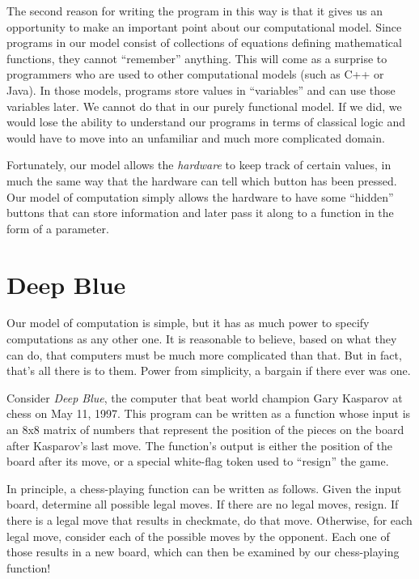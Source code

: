 The second reason for writing the program in this way is that it
gives us an opportunity to make an important point about our
computational model.  Since programs in our model consist of collections of equations defining mathematical functions, they cannot ``remember'' anything.
This will come as a surprise to programmers who are
used to other computational models (such as C++ or Java).
In those models, programs store
values in ``variables'' and can use those variables later.
We cannot do that in our purely functional model.  If we did, we
would lose the ability to understand our programs in terms of classical
logic and would have to move into an unfamiliar and
much more complicated domain.

Fortunately, our
model allows the \emph{hardware} to keep track of certain values, in much the
same way that the hardware can tell which button has been pressed.
Our model of computation simply allows the hardware to have some
``hidden'' buttons that can store information and later pass it along to
a function in the form of a parameter.

\section{Deep Blue}

Our model of computation is simple, but it has as much power to specify computations
as any other one. It is reasonable to believe, based on what they
can do, that computers must be much more complicated than that.
But in fact, that's all there is to them.
Power from simplicity, a bargain if there ever was one.

Consider \textit{Deep Blue}, the
computer that beat world champion Gary Kasparov at chess on May 11,
1997.  This program can be written as a function whose input is
an 8x8 matrix of numbers that represent the position of the pieces
on the board after Kasparov's last move.  The function's output is
either the position of the board after its move, or a special
white-flag token used to ``resign'' the game.

In principle, a chess-playing function can be written as follows.
Given the input board, determine all possible legal moves.  If there
are no legal moves, resign.  If there is a legal move that results
in checkmate, do that move.  Otherwise, for each legal move, consider
each of the possible moves by the opponent.  Each one of those results
in a new board, which can then be examined by our chess-playing
function!

